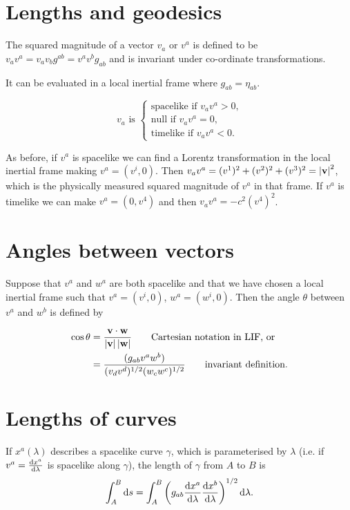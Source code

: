 \documentclass{notes}
\renewcommand{\v}{\vect{v}}
\begin{document}
\section{Lengths and geodesics}

The squared magnitude of a vector $v_a$ or $v^a$ is defined to be
$v_a v^a= v_a v_b g^{ab}= v^a v^b g_{ab}$ and is
invariant under co-ordinate transformations.

It can be evaluated in a local inertial frame where
$g_{ab}=\eta_{ab}$.

\[
v_a \text{ is } \begin{cases}
\text{spacelike if $v_a v^a > 0$,} \\
\text{null if $v_a v^a = 0$,}\\
\text{timelike if $v_a v^a < 0$.}
\end{cases}
\]

As before, if $v^a$ is spacelike we can find a Lorentz transformation
in the local inertial frame making $v^a=(v^i,0)$.  Then $v_a v^a=
(v^1)^2+ (v^2)^2 +(v^3)^2= \abs{\v}^2$, which is the physically
measured squared magnitude of $v^a$ in that frame.  If $v^a$ is
timelike we can make $v^a=(0,v^4)$ and then $v_a v^a = -c^2 (v^4)^2$.

\section{Angles between vectors}
Suppose that $v^a$ and $w^a$ are both spacelike and that we have
chosen a local inertial frame such that $v^a=(v^i,0)$,
$w^a=(w^i,0)$.  Then the angle $\theta$ between $v^a$ and $w^b$
is defined by

\begin{align*}
\cos \theta &= \frac{\v \cdot \vect{w}}{\abs{\v} \abs{\vect{w}}} \qquad
\text{Cartesian notation in LIF, or}\\
&= \frac{(g_{a b} v^a w^b)}{(v_d v^d)^{1/2}
(w_c w^c)^{1/2} } \qquad
\text{invariant definition.}
\end{align*}

\section{Lengths of curves}

If $x^a(\lambda)$ describes a spacelike curve $\gamma$, which is
parameterised by $\lambda$ (i.e. if $v^a=\frac{\mathrm{d} x^a}{\mathrm{d}\lambda}$ is spacelike
along $\gamma$), the length of $\gamma$ from $A$ to $B$ is
\[
\int_A^B \mathrm{d} s= \int_A^B \left( g_{a b} \frac{\mathrm{d} x^a}{\mathrm{d}\lambda}\frac{\mathrm{d} x^b}{\mathrm{d}\lambda} \right)^{1/2} \mathrm{d}\lambda.
\]
\end{document}
